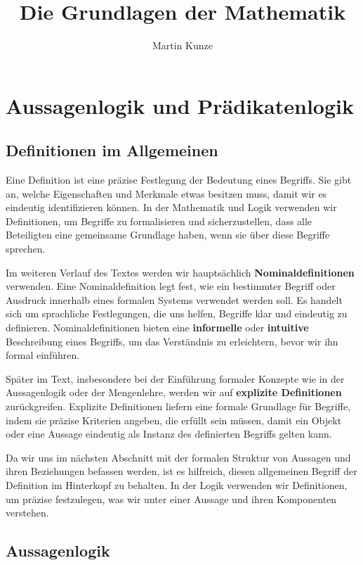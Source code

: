 \documentclass{book}
\title{Die Grundlagen der Mathematik}
\author{Martin Kunze}
\date{}
\theoremstyle{plain}
\theoremstyle{remark}
\theoremstyle{definition}
\begin{document}
	\maketitle
	\tableofcontents
	\listoftheorems

\chapter{Aussagenlogik und Prädikatenlogik}

\section{Definitionen im Allgemeinen}

Eine Definition ist eine präzise Festlegung der Bedeutung eines Begriffs. Sie gibt an, welche Eigenschaften und Merkmale etwas besitzen muss, damit wir es eindeutig identifizieren können. In der Mathematik und Logik verwenden wir Definitionen, um Begriffe zu formalisieren und sicherzustellen, dass alle Beteiligten eine gemeinsame Grundlage haben, wenn sie über diese Begriffe sprechen.

Im weiteren Verlauf des Textes werden wir hauptsächlich \textbf{Nominaldefinitionen} verwenden. Eine Nominaldefinition legt fest, wie ein bestimmter Begriff oder Ausdruck innerhalb eines formalen Systems verwendet werden soll. Es handelt sich um sprachliche Festlegungen, die uns helfen, Begriffe klar und eindeutig zu definieren. Nominaldefinitionen bieten eine \textbf{informelle} oder \textbf{intuitive} Beschreibung eines Begriffs, um das Verständnis zu erleichtern, bevor wir ihn formal einführen.

Später im Text, insbesondere bei der Einführung formaler Konzepte wie in der Aussagenlogik oder der Mengenlehre, werden wir auf \textbf{explizite Definitionen} zurückgreifen. Explizite Definitionen liefern eine formale Grundlage für Begriffe, indem sie präzise Kriterien angeben, die erfüllt sein müssen, damit ein Objekt oder eine Aussage eindeutig als Instanz des definierten Begriffs gelten kann.

Da wir uns im nächsten Abschnitt mit der formalen Struktur von Aussagen und ihren Beziehungen befassen werden, ist es hilfreich, diesen allgemeinen Begriff der Definition im Hinterkopf zu behalten. In der Logik verwenden wir Definitionen, um präzise festzulegen, was wir unter einer Aussage und ihren Komponenten verstehen.

\section{Aussagenlogik}
\end{document}
